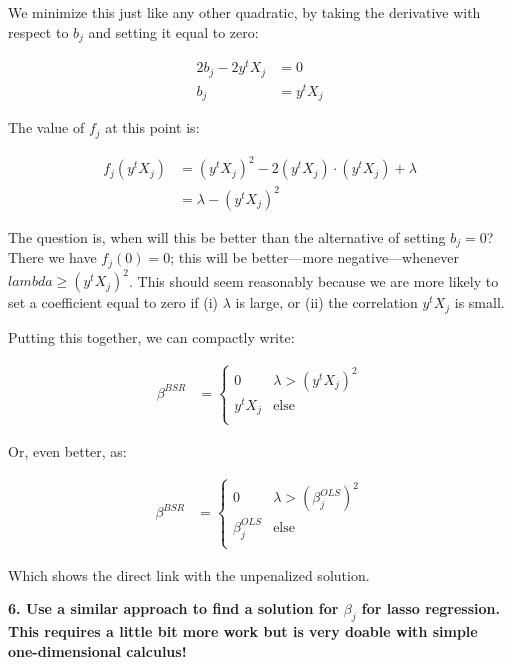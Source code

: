 \documentclass[12pt,hidelinks]{article}
\numberwithin{equation}{section}
\begin{document}
We minimize this just like any other quadratic, by taking the derivative with
respect to $b_j$ and setting it equal to zero:

\begin{align*}
2 b_j - 2  y^t X_j &= 0 \\
b_j &= y^t X_j
\end{align*}

The value of $f_j$ at this point is:

\begin{align*}
f_j(y^t X_j) &= (y^t X_j)^2 - 2  (y^t X_j) \cdot (y^t X_j) + \lambda \\
&= \lambda - (y^t X_j)^2
\end{align*}

The question is, when will this be better than the alternative of setting $b_j = 0$?
There we have $f_j(0) = 0$; this will be better---more negative---whenever
$lambda \geq (y^t X_j)^2$. This should seem reasonably because we are more likely to
set a coefficient equal to zero if (i) $\lambda$ is large, or (ii) the correlation
$y^t X_j$ is small.

Putting this together, we can compactly write:

\begin{align*}
\beta^{BSR} &= \begin{cases} 0 & \lambda > (y^t X_j)^2 \\
                             y^t X_j & \text{else} \\ \end{cases}
\end{align*}

Or, even better, as:

\begin{align*}
\beta^{BSR} &= \begin{cases} 0 & \lambda > (\beta^{OLS}_j)^2 \\
                             \beta^{OLS}_j & \text{else} \\ \end{cases}
\end{align*}

Which shows the direct link with the unpenalized solution.

\vspace*{12pt}

\textbf{6. Use a similar approach to find a solution for $\beta_j$ for lasso regression.
This requires a little bit more work but is very doable with simple one-dimensional
calculus!}

\vspace*{12pt}
\end{document}
